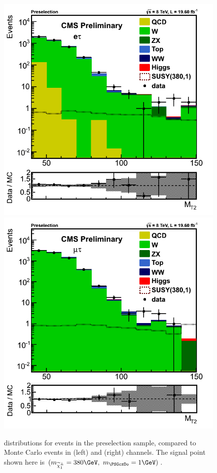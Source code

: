 \begin{figure}[!Hhtb]
\centering
\includegraphics[angle=0,scale=0.375]{SelectionEleTau/MT2.png}
\includegraphics[angle=0,scale=0.375]{SelectionMuTau/MT2_Ratio_Preselection_unBlinded.png}
\caption{\mttwo  distributions for events in the preselection sample, compared to Monte Carlo events in (left) \eTau and (right) \muTau channels. The signal point shown here is $(m_{\chione}=380\GeV,~m_{\PSGczDo}=1\GeV)$.}
\label{fig:mt2leptontau}
\end{figure}

